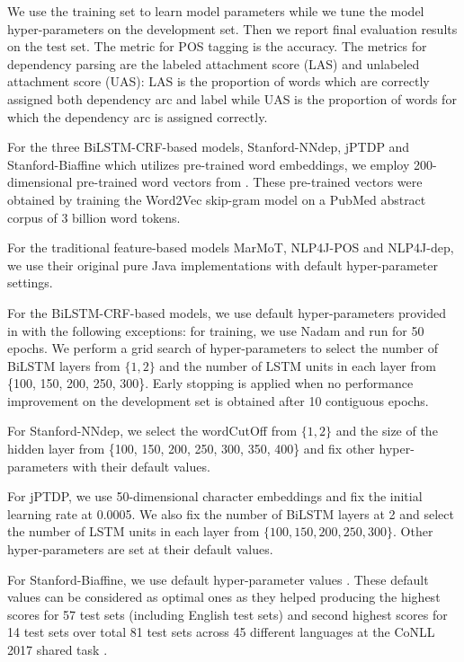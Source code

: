 \documentclass[twocolumn,hyperref]{bmcart}\pdfoutput=1
\begin{document}
We use the training set  to learn model parameters while we tune the model hyper-parameters on the development set. Then we report final evaluation results on the test set. The metric for POS tagging is the accuracy. The metrics for dependency parsing are the labeled attachment score (LAS) and unlabeled attachment score (UAS): LAS is the proportion of words which are correctly
assigned both dependency arc and label
while UAS is the proportion of words for which
the dependency arc is assigned correctly.

For  the three BiLSTM-CRF-based models, Stanford-NNdep, jPTDP and Stanford-Biaffine which utilizes pre-trained word embeddings,  we employ 200-dimensional pre-trained word vectors from \cite{chiu-EtAl:2016:BioNLP16}. 
These pre-trained vectors were obtained by training the Word2Vec skip-gram model \cite{Mikolov:2013} on a PubMed abstract corpus of 3 billion word tokens.

For the traditional feature-based models MarMoT, NLP4J-POS and NLP4J-dep, we use their original pure Java implementations with default hyper-parameter settings. 

For the BiLSTM-CRF-based models, we use default hyper-parameters provided in \cite{reimers-gurevych:2017:EMNLP2017}  with the following exceptions: for training, we use Nadam \cite{Dozat2015IncorporatingNM} and run for 50 epochs. We perform a grid search of hyper-parameters  to select the number of BiLSTM layers from $\{1, 2\}$ and the number of LSTM units in each layer from \{100, 150, 200, 250, 300\}.  Early stopping is applied when no performance improvement on the development set is obtained after 10 contiguous epochs. 



For Stanford-NNdep, we select the  \textsf{\small{wordCutOff}}  from $\{1, 2\}$ and  the size of the hidden layer  from \{100, 150, 200, 250, 300, 350, 400\} and fix other hyper-parameters  with their default values. 
 
 For jPTDP, we use 50-dimensional character embeddings and fix the initial learning rate at 0.0005. We also fix the number of BiLSTM layers  at 2 and select the number of LSTM units in each layer from $\{100, 150, 200, 250, 300\}$. Other hyper-parameters  are set at their default values. 

For Stanford-Biaffine, we use default hyper-parameter values  \cite{dozat-qi-manning:2017:K17-3}. These default values can be considered as optimal ones as they helped producing the highest scores for 57 test sets (including English test sets) and second highest scores for  14 test sets over total 81 test sets across 45 different languages at the CoNLL 2017 shared task  \cite{zeman-EtAl:2017:K17-3}. 
\end{document}
